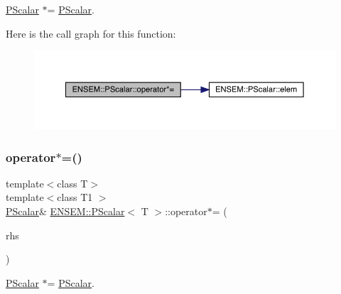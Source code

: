 \mbox{\hyperlink{classENSEM_1_1PScalar}{P\+Scalar}} $\ast$= \mbox{\hyperlink{classENSEM_1_1PScalar}{P\+Scalar}}. 

Here is the call graph for this function\+:
\nopagebreak
\begin{figure}[H]
\begin{center}
\leavevmode
\includegraphics[width=350pt]{d3/d27/classENSEM_1_1PScalar_addccfa9164f9d80554657387932185c4_cgraph}
\end{center}
\end{figure}
\mbox{\label{classENSEM_1_1PScalar_addccfa9164f9d80554657387932185c4}} 
\subsubsection{\texorpdfstring{operator$\ast$=()}{operator*=()}\hspace{0.1cm}{\footnotesize\ttfamily [3/3]}}
{\footnotesize\ttfamily template$<$class T$>$ \\
template$<$class T1 $>$ \\
\mbox{\hyperlink{classENSEM_1_1PScalar}{P\+Scalar}}\& \mbox{\hyperlink{classENSEM_1_1PScalar}{E\+N\+S\+E\+M\+::\+P\+Scalar}}$<$ T $>$\+::operator$\ast$= (\begin{DoxyParamCaption}\item[{const \mbox{\hyperlink{classENSEM_1_1PScalar}{P\+Scalar}}$<$ T1 $>$ \&}]{rhs }\end{DoxyParamCaption})\hspace{0.3cm}{\ttfamily [inline]}}



\mbox{\hyperlink{classENSEM_1_1PScalar}{P\+Scalar}} $\ast$= \mbox{\hyperlink{classENSEM_1_1PScalar}{P\+Scalar}}. 

